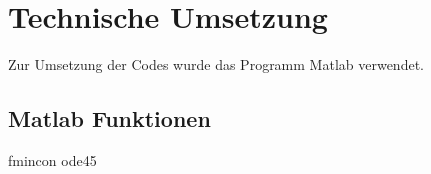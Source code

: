\chapter{Technische Umsetzung}

Zur Umsetzung der Codes wurde das Programm Matlab verwendet.

\section{Matlab Funktionen}
fmincon
ode45

